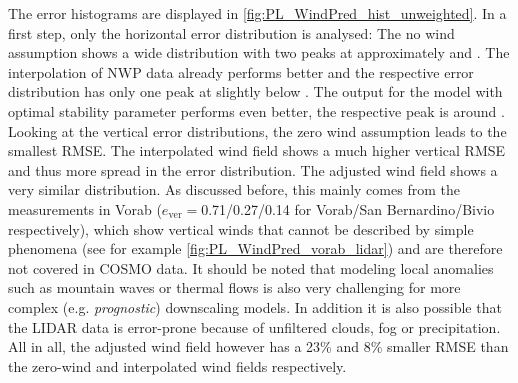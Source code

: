 \documentclass[twocolumn,letterpaper]{IEEEAerospaceCLS}
\begin{document}
The error histograms are displayed in \cref{fig:PL_WindPred_hist_unweighted}. In a first step, only the horizontal error distribution is analysed: The no wind assumption shows a wide distribution with two peaks at approximately  and . The interpolation of \ac{NWP} data already performs better and the respective error distribution has only one peak at slightly below . The output for the model with optimal stability parameter performs even better, the respective peak is around . Looking at the vertical error distributions, the zero wind assumption leads to the smallest \ac{RMSE}. The interpolated wind field shows a much higher vertical RMSE and thus more spread in the error distribution. The adjusted wind field shows a very similar distribution. As discussed before, this mainly comes from the measurements in Vorab ($e_\text{ver}=$0.71/0.27/0.14 for Vorab/San Bernardino/Bivio respectively), which show vertical winds that cannot be described by simple phenomena (see for example \cref{fig:PL_WindPred_vorab_lidar}) and are therefore not covered in \ac{COSMO} data. It should be noted that modeling local anomalies such as mountain waves or thermal flows is also very challenging for more complex (e.g. \emph{prognostic}) downscaling models. In addition it is also possible that the LIDAR data is error-prone because of unfiltered clouds, fog or precipitation. All in all, the adjusted wind field however has a 23\% and 8\% smaller \ac{RMSE} than the zero-wind and interpolated wind fields respectively.
\end{document}
